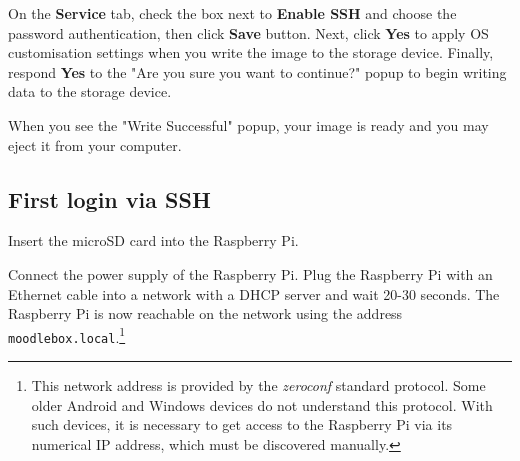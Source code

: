 \documentclass[12pt]{article}
\begin{document}
On the \textbf{Service} tab, check the box next to \textbf{Enable SSH} and choose the password authentication, then click \textbf{Save} button.
Next, click \textbf{Yes} to apply OS customisation settings when you write the image to the storage device.
Finally, respond \textbf{Yes} to the "Are you sure you want to continue?" popup to begin writing data to the storage device.

When you see the "Write Successful" popup, your image is ready and you may eject it from your computer.

\subsection{First login via SSH}

Insert the microSD card into the Raspberry Pi.

Connect the power supply of the Raspberry Pi.
Plug the Raspberry Pi with an Ethernet cable into a network with a DHCP server and wait 20-30 seconds.
The Raspberry Pi is now reachable on the network using the address \lstinline{moodlebox.local}.\footnote{This network address is provided by the \emph{zeroconf} standard protocol.
Some older Android and Windows devices do not understand this protocol.
With such devices, it is necessary to get access to the Raspberry Pi via its numerical IP address, which must be discovered manually.}

\end{document}
